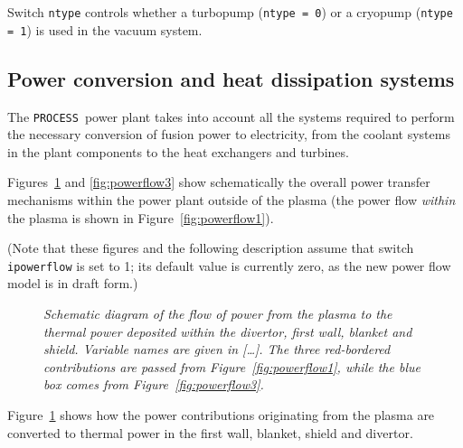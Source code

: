 \documentclass[11pt,a4paper]{report}
\newcommand{\process}{\mbox{\texttt{PROCESS}}}
\begin{document}
Switch \texttt{ntype} controls whether a turbopump (\texttt{ntype = 0}) or a
cryopump (\texttt{ntype = 1}) is used in the vacuum system.

\subsection{Power conversion and heat dissipation systems}
\label{sec:powerflow}

The \process\ power plant takes into account all the systems required to
perform the necessary conversion of fusion power to electricity, from the
coolant systems in the plant components to the heat exchangers and turbines.
%
%

Figures~\ref{fig:powerflow2} and \ref{fig:powerflow3} show schematically the
overall power transfer mechanisms within the power plant outside of the plasma
(the power flow \textit{within}\/ the plasma is shown in
Figure~\ref{fig:powerflow1}).

(Note that these figures and the following description assume that switch
\texttt{ipowerflow} is set to 1; its default value is currently
zero, as the new power flow model is in draft form.)

\begin{figure}[tbph]
\caption[Power flow within the fusion power plant core]
{\label{fig:powerflow2} \textit{Schematic diagram of the flow of power from
    the plasma to the thermal power deposited within the divertor, first wall,
    blanket and shield. Variable names are given in [\ldots]. The three
    red-bordered contributions are passed from Figure~\ref{fig:powerflow1},
    while the blue box comes from Figure~\ref{fig:powerflow3}.} }
\end{figure}

Figure~\ref{fig:powerflow2} shows how the power contributions originating from
the plasma are converted to thermal power in the first wall, blanket, shield
and divertor.
\end{document}

